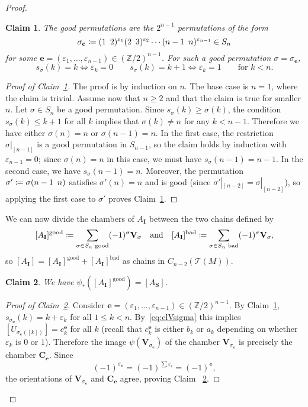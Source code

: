 \documentclass[11 pt]{article}
\theoremstyle{plain}
\newtheorem{claims}{Claim}
\theoremstyle{definition}
\numberwithin{equation}{section}
\newcommand\Z{\ensuremath{\mathbb{Z}}}
\renewcommand{\epsilon}{\varepsilon}
\newcommand\Tits{\ensuremath{\mathcal{T}}}
\newcommand\II{\mathbf{I}}
\newcommand\VV{\mathbf{V}}
\newcommand\bS{\mathbf{S}}
\newcommand\coloneq{\mathrel{\mathop:}\mkern-1.2mu=}
\newcommand\e{\mathbf{e}}
\newcommand\CC{\mathbf{C}}
\begin{document}
\begin{proof}
\begin{claims}
\label{claim:gooddesc}
The good permutations are the $2^{n-1}$ permutations of the form
\[\sigma_{\e}\coloneq (1\ \,2)^{\epsilon_1}(2\ \,3)^{\epsilon_2}\cdots (n-1\ \,n)^{\epsilon_{n-1}} \in S_n\]
for some $\e = (\epsilon_1,\ldots,\epsilon_{n-1}) \in (\Z/2)^{n-1}$. For such a good permutation $\sigma=\sigma_\e$,
\[s_\sigma(k)=k\iff\epsilon_k=0\qquad s_\sigma(k)=k+1\iff\epsilon_k=1\qquad\text{for }k<n.\]
\end{claims}
\begin{proof}[Proof of Claim~\ref{claim:gooddesc}]
The proof is by induction on $n$.  The base case is $n=1$, where
the claim is trivial.  Assume now that $n\geq 2$ and that the claim is true
for smaller $n$.  Let $\sigma \in S_n$ be a good permutation.
Since $s_\sigma(k)\geq \sigma(k)$, the 
condition $s_\sigma(k)\leq k+1$ for all $k$ implies that $\sigma(k)\neq n$ for any $k<n-1$. 
Therefore we have either $\sigma(n)=n$ or $\sigma(n-1)=n$.  In the first case, 
the restriction $\sigma|_{[n-1]}$ is a good permutation in $S_{n-1}$, so the claim holds by induction with $\epsilon_{n-1}=0$; since $\sigma(n)=n$ in this case, we must have $s_\sigma(n-1)=n-1$. 
In the second case, we have $s_\sigma(n-1)=n$. Moreover, the permutation $\sigma'\coloneq \sigma (n-1\,\ n)$ satisfies 
$\sigma'(n)=n$ and is good (since $\sigma'|_{[n-2]}=\sigma|_{[n-2]}$), so applying the first case to $\sigma'$ proves Claim~\ref{claim:gooddesc}.
\end{proof}

We can now divide the chambers of $A_{\II}$ between the two chains defined by
\[[A_{\II}]^{\text{good}} \coloneq  \sum_{\sigma \in S_n \text{ good}} (-1)^{\sigma} \VV_{\sigma} \quad \text{and} \quad [A_{\II}]^{\text{bad}} \coloneq \sum_{\sigma \in S_n \text{ bad}} (-1)^{\sigma} \VV_{\sigma},\]
so $[A_{\II}] = [A_{\II}]^{\text{good}} + [A_{\II}]^{\text{bad}}$ as chains in $C_{n-2}(\Tits(M))$.
\begin{claims}
\label{claim:dealgood}
We have $\psi_{\ast}([A_{\II}]^{\text{good}}) = [A_{\bS}]$.
\end{claims}
\begin{proof}[Proof of Claim~\ref{claim:dealgood}]
Consider $\e = (\epsilon_1,\ldots,\epsilon_{n-1}) \in (\Z/2)^{n-1}$.
By Claim~\ref{claim:gooddesc}, $s_{\sigma_\e}(k)=k+\epsilon_k$ for all $1\leq k<n$.  By~\eqref{eq:clVsigma} 
this implies $[U_{\sigma_\e([k])}]=c^\e_k$ for all $k$ (recall that $c^\e_k$ is either 
$b_k$ or $a_k$ depending on whether $\epsilon_k$ is $0$ or $1$).  Therefore the image 
$\psi(\VV_{\sigma_\e})$ of the chamber $\VV_{\sigma_\e}$ is precisely the chamber 
$\CC_\e$.  Since 
\[(-1)^{\sigma_\e}=(-1)^{\sum \epsilon_i}=(-1)^\e,\]
the orientations of $\VV_{\sigma_\e}$ and $\CC_\e$ agree, proving Claim ~\ref{claim:dealgood}.\end{proof}


\end{proof}
\end{document}
